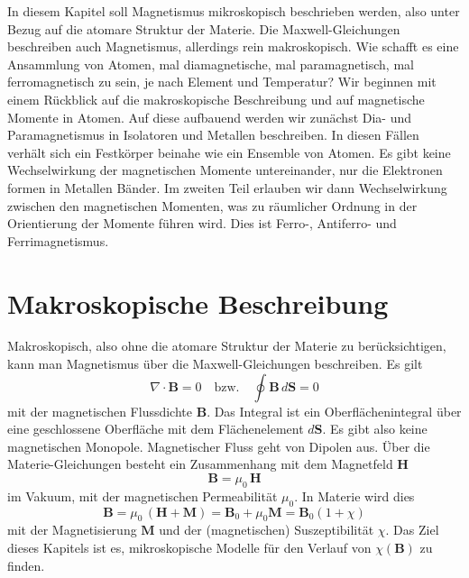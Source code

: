 In diesem Kapitel soll Magnetismus mikroskopisch beschrieben werden, also unter Bezug auf die atomare Struktur der Materie. Die Maxwell-Gleichungen beschreiben auch Magnetismus, allerdings rein makroskopisch. Wie schafft es eine Ansammlung von Atomen, mal diamagnetische, mal paramagnetisch, mal ferromagnetisch zu sein, je nach Element und Temperatur? Wir beginnen mit einem Rückblick auf die makroskopische Beschreibung und auf magnetische Momente in Atomen. Auf diese aufbauend werden wir zunächst Dia- und Paramagnetismus in Isolatoren und Metallen beschreiben. In diesen Fällen verhält sich ein Festkörper beinahe wie ein Ensemble von Atomen. Es gibt keine Wechselwirkung der magnetischen Momente untereinander, nur die Elektronen formen in Metallen Bänder. Im zweiten Teil erlauben wir dann Wechselwirkung zwischen den magnetischen Momenten, was zu räumlicher Ordnung in der Orientierung der Momente führen wird. Dies ist Ferro-, Antiferro- und Ferrimagnetismus.


\section{Makroskopische Beschreibung}

Makroskopisch, also ohne die atomare Struktur der Materie zu berücksichtigen, kann man Magnetismus über die Maxwell-Gleichungen beschreiben. Es gilt 
\begin{equation}
    \nabla \cdot \bm{B} = 0 \quad \text{bzw.} \quad \oint \bm{B} \, d\bm{S} = 0 
\end{equation}
mit der magnetischen Flussdichte $\bm{B}$. Das Integral ist ein Oberflächenintegral über eine geschlossene Oberfläche mit dem Flächenelement $d\bm{S}$. Es gibt also keine magnetischen Monopole. Magnetischer Fluss geht von Dipolen aus. Über die Materie-Gleichungen besteht ein Zusammenhang mit dem Magnetfeld $\bm{H}$
\begin{equation}
    \bm{B} = \mu_0 \, \bm{H}
\end{equation}
im Vakuum, mit der magnetischen Permeabilität $\mu_0$. In Materie wird dies
\begin{equation}
    \bm{B} = \mu_0 \, \left( \bm{H} + \bm{M} \right) = \bm{B}_0 + \mu_0 \bm{M} = \bm{B}_0 \left( 1 + \chi \right)
\end{equation}
mit der Magnetisierung $\bm{M}$ und der (magnetischen) Suszeptibilität $\chi$. Das Ziel dieses Kapitels ist es, mikroskopische Modelle für den Verlauf von $\chi(\bm{B})$ zu finden.


